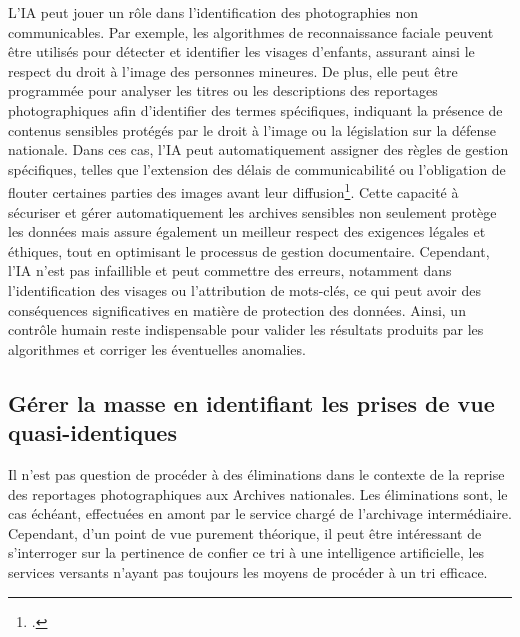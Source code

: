 L’IA peut jouer un rôle dans l’identification des photographies non communicables. Par exemple, les algorithmes de reconnaissance faciale peuvent être utilisés pour détecter et identifier les visages d'enfants, assurant ainsi le respect du droit à l'image des personnes mineures. De plus, elle peut être programmée pour analyser les titres ou les descriptions des reportages photographiques afin d’identifier des termes spécifiques, indiquant la présence de contenus sensibles protégés par le droit à l’image ou la législation sur la défense nationale. Dans ces cas, l’IA peut automatiquement assigner des règles de gestion spécifiques, telles que l’extension des délais de communicabilité ou l’obligation de flouter certaines parties des images avant leur diffusion\footcite{baronDarkArchivesEdemocracy2017}. Cette capacité à sécuriser et gérer automatiquement les archives sensibles non seulement protège les données mais assure également un meilleur respect des exigences légales et éthiques, tout en optimisant le processus de gestion documentaire.
Cependant, l'IA n'est pas infaillible et peut commettre des erreurs, notamment dans l'identification des visages ou l'attribution de mots-clés, ce qui peut avoir des conséquences significatives en matière de protection des données. Ainsi, un contrôle humain reste indispensable pour valider les résultats produits par les algorithmes et corriger les éventuelles anomalies.

\subsection*{Gérer la masse en identifiant les prises de vue quasi-identiques}
Il n’est pas question de procéder à des éliminations dans le contexte de la reprise des reportages photographiques aux Archives nationales. Les éliminations sont, le cas échéant, effectuées en amont par le service chargé de l’archivage intermédiaire. Cependant, d’un point de vue purement théorique, il peut être intéressant de s’interroger sur la pertinence de confier ce tri à une intelligence artificielle, les services versants n’ayant pas toujours les moyens de procéder à un tri efficace.

